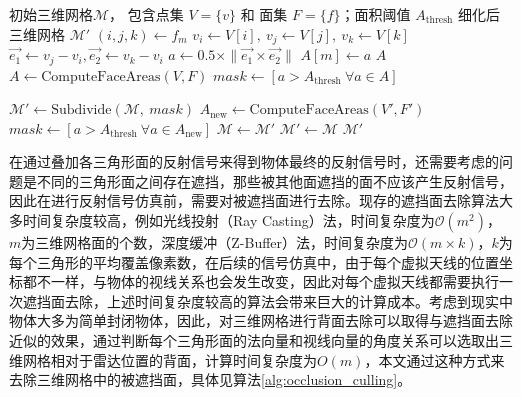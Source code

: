 \begin{algorithm}[H]
\caption{三维网格细分算法}
\label{alg:adaptive_subdivision}
\begin{algorithmic}[1]
\Require
\Statex 初始三维网格$\mathcal{M}$， 包含点集 $V= \{v\}$ 和 面集 $F=\{f\}$；面积阈值 $A_{\text{thresh}}$
\Ensure 细化后三维网格 $\mathcal{M}'$
        \State $(i,j,k) \gets f_m$ 
        \State $v_i \gets V[i],\ v_j \gets V[j],\ v_k \gets V[k]$
        \State  $\vec{e_1} \gets v_j - v_i, \vec{e_2} \gets v_k - v_i$
        \State  $a \gets 0.5 \times \|\vec{e_1} \times \vec{e_2}\|$ 
        \State $A[m] \gets a$
    \EndFor
    \State \Return $A$
\EndFunction
{}
\State $A \gets \text{ComputeFaceAreas}(V,F)$
\State $mask \gets [a > A_{\text{thresh}}\ \forall a \in A]$ 

 \label{line:while_loop} 
\State $\mathcal{M}' \gets \text{Subdivide}(\mathcal{M},\ mask)$ \label{line:subdivide}
\State $A_{\text{new}} \gets \text{ComputeFaceAreas}(V',F')$  \label{line:compute_areas}
\State $mask \gets [a > A_{\text{thresh}}\ \forall a \in A_{\text{new}}]$  \label{line:update_mask}
\State $\mathcal{M} \gets \mathcal{M}'$ \label{line:update_mesh}
\EndWhile
\State $\mathcal{M}' \gets \mathcal{M}$
\State \Return $\mathcal{M}'$ 
\EndFunction
\end{algorithmic}
\end{algorithm}
在通过叠加各三角形面的反射信号来得到物体最终的反射信号时，还需要考虑的问题是不同的三角形面之间存在遮挡，那些被其他面遮挡的面不应该产生反射信号，因此在进行反射信号仿真前，需要对被遮挡面进行去除。现存的遮挡面去除算法大多时间复杂度较高，例如光线投射（Ray Casting）法，时间复杂度为$\mathcal{O}(m^2)$，$m$为三维网格面的个数，深度缓冲（Z-Buffer）法，时间复杂度为$\mathcal{O}(m\times k)$，$k$为每个三角形的平均覆盖像素数，在后续的信号仿真中，由于每个虚拟天线的位置坐标都不一样，与物体的视线关系也会发生改变，因此对每个虚拟天线都需要执行一次遮挡面去除，上述时间复杂度较高的算法会带来巨大的计算成本。考虑到现实中物体大多为简单封闭物体，因此，对三维网格进行背面去除可以取得与遮挡面去除近似的效果，通过判断每个三角形面的法向量和视线向量的角度关系可以选取出三维网格相对于雷达位置的背面，计算时间复杂度为$O(m)$，本文通过这种方式来去除三维网格中的被遮挡面，具体见算法\ref{alg:occlusion_culling}。
